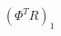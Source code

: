 \documentclass[preview]{standalone}
\begin{document}
\begin{align*}
(\Phi^{T}R)_1
\end{align*}
\end{document}
